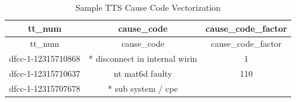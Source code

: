 \documentclass[]{article}
\begin{document}
\begin{longtable}[c]{@{}ccc@{}}
\caption{Sample TTS Cause Code Vectorization}\tabularnewline
\toprule
\begin{minipage}[b]{0.24\columnwidth}\centering\strut
tt\_num
\strut\end{minipage} &
\begin{minipage}[b]{0.39\columnwidth}\centering\strut
cause\_code
\strut\end{minipage} &
\begin{minipage}[b]{0.24\columnwidth}\centering\strut
cause\_code\_factor
\strut\end{minipage}\tabularnewline
\midrule
\endfirsthead
\toprule
\begin{minipage}[b]{0.24\columnwidth}\centering\strut
tt\_num
\strut\end{minipage} &
\begin{minipage}[b]{0.39\columnwidth}\centering\strut
cause\_code
\strut\end{minipage} &
\begin{minipage}[b]{0.24\columnwidth}\centering\strut
cause\_code\_factor
\strut\end{minipage}\tabularnewline
\midrule
\endhead
\begin{minipage}[t]{0.24\columnwidth}\centering\strut
dfcc-1-12315710868
\strut\end{minipage} &
\begin{minipage}[t]{0.39\columnwidth}\centering\strut
* disconnect in internal wirin
\strut\end{minipage} &
\begin{minipage}[t]{0.24\columnwidth}\centering\strut
1
\strut\end{minipage}\tabularnewline
\begin{minipage}[t]{0.24\columnwidth}\centering\strut
dfcc-1-12315710637
\strut\end{minipage} &
\begin{minipage}[t]{0.39\columnwidth}\centering\strut
nt mat6d faulty
\strut\end{minipage} &
\begin{minipage}[t]{0.24\columnwidth}\centering\strut
110
\strut\end{minipage}\tabularnewline
\begin{minipage}[t]{0.24\columnwidth}\centering\strut
dfcc-1-12315707678
\strut\end{minipage} &
\begin{minipage}[t]{0.39\columnwidth}\centering\strut
* sub system / cpe
\strut\end{minipage} &

\end{longtable}
\end{document}
